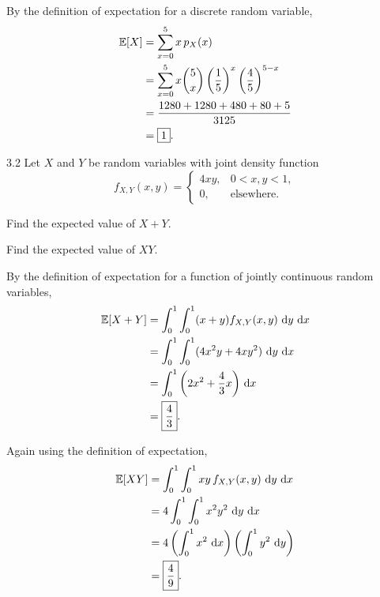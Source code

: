 \documentclass[11pt,oneside]{article}
\begin{document}
\begin{solution}
By the definition of expectation for a discrete random variable,
\[
\begin{aligned}
    \mathbb{E}[X]
    &=\sum_{x=0}^{5}x\,p_X(x)\\
    &=\sum_{x=0}^{5}
      x\binom{5}{x}
      \left(\frac15\right)^x
      \left(\frac45\right)^{5-x}\\
    &=\frac{1280+1280+480+80+5}{3125}\\
    &=\boxed{1}.
\end{aligned}
\]
\end{solution}

\begin{problem}{3.2}
Let $X$ and $Y$ be random variables with joint density function
\[
    f_{X,Y}(x,y)=
    \begin{cases}
        4xy, & 0<x,y<1,\\
        0, & \text{elsewhere}.
    \end{cases}
\]
\begin{problemsubparts}
    \item Find the expected value of $X+Y$.
    \item Find the expected value of $XY$.
\end{problemsubparts}
\end{problem}

\begin{solution}
\begin{problemsubparts}
    \item By the definition of expectation for a function of jointly continuous random variables,
    \[
    \begin{aligned}
        \mathbb{E}[X+Y]
        &=\int_0^1\int_0^1 (x+y)f_{X,Y}(x,y)\,\mathop{}\!\mathrm{d} y\,\mathop{}\!\mathrm{d} x\\
        &=\int_0^1\int_0^1 (4x^2y+4xy^2)\,\mathop{}\!\mathrm{d} y\,\mathop{}\!\mathrm{d} x\\
        &=\int_0^1\left(2x^2+\frac43x\right)\,\mathop{}\!\mathrm{d} x\\
        &=\boxed{\frac43}.
    \end{aligned}
    \]

    \item Again using the definition of expectation,
    \[
    \begin{aligned}
        \mathbb{E}[XY]
        &=\int_0^1\int_0^1 xy\,f_{X,Y}(x,y)\,\mathop{}\!\mathrm{d} y\,\mathop{}\!\mathrm{d} x\\
        &=4\int_0^1\int_0^1 x^2y^2\,\mathop{}\!\mathrm{d} y\,\mathop{}\!\mathrm{d} x\\
        &=4\left(\int_0^1x^2\,\mathop{}\!\mathrm{d} x\right)
             \left(\int_0^1y^2\,\mathop{}\!\mathrm{d} y\right)\\
        &=\boxed{\frac49}.
    \end{aligned}
    \]
\end{problemsubparts}
\end{solution}
\end{document}
